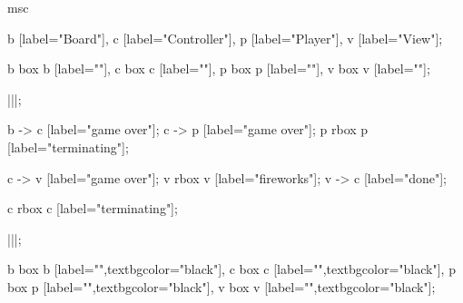 \begin{msc}
msc
{

b [label="Board"],
c [label="Controller"],
p [label="Player"],
v [label="View"];

b box b [label=""],
c box c [label=""],
p box p [label=""],
v box v [label=""];

|||;

b -> c [label="game over"];
c -> p [label="game over"];
p rbox p [label="terminating"];

c -> v [label="game over"];
v rbox v [label="fireworks"];
v -> c [label="done"];

c rbox c [label="terminating"];

|||;

b box b [label="",textbgcolor="black"],
c box c [label="",textbgcolor="black"],
p box p [label="",textbgcolor="black"],
v box v [label="",textbgcolor="black"];

}
\end{msc}
